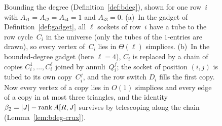 \begin{figure}[t]
\caption{Bounding the degree (Definition~\ref{def:bdeg}), shown for one row~$i$ with $A_{i1}=A_{i2}=A_{i4}=1$ and $A_{i3}=0$.
(a)~In the gadget of Definition~\ref{def:gadget}, all $\ell$ sockets of row~$i$ have a tube to the row cycle~$C_i$ in the universe (only the tubes of the $1$-entries are drawn), so every vertex of~$C_i$ lies in $\Theta(\ell)$ simplices.
(b)~In the bounded-degree gadget (here $\ell=4$), $C_i$ is replaced by a chain of copies $C_i^1,\dots,C_i^{\ell}$ joined by annuli~$Q_i^j$; the socket of position $(i,j)$ is tubed to its own copy~$C_i^j$, and the row switch $D_i$ fills the first copy.
Now every vertex of a copy lies in $O(1)$ simplices and every edge of a copy in at most three triangles, and the identity $\beta_2=|J|-\operatorname{rank} A[R,J]$ survives by telescoping along the chain (Lemma~\ref{lem:bdeg-crux}).}
\label{fig:bdeg}
\end{figure}
